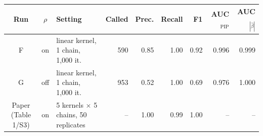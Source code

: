 \begin{tabular}{c c l r r r r r r}
\toprule
Run & $\rho$ & Setting & Called & Prec. & Recall & F1 & AUC$_{\mathrm{PIP}}$ & AUC$_{|\hat\beta|}$ \\
\midrule
F & on & linear kernel, 1 chain, 1{,}000 it. & 590 & 0.85 & 1.00 & 0.92 & 0.996 & 0.999 \\
G & off & linear kernel, 1 chain, 1{,}000 it. & 953 & 0.52 & 1.00 & 0.69 & 0.976 & 1.000 \\
\midrule
Paper (Table 1/S3) & on & 5 kernels $\times$ 5 chains, 50 replicates & -- & 1.00 & 0.99 & 1.00 & -- & -- \\
\bottomrule
\end{tabular}
